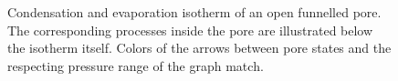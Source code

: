 \documentclass[../../thesis.tex]{subfiles}
\begin{document}
\begin{figure}[p]
{
    \label{fig:open-funnelled-pore-evaporation}}
    \caption{Condensation \protect{} and evaporation \protect{} isotherm of an open funnelled pore. The corresponding processes inside the pore are illustrated below the isotherm itself. Colors of the arrows between pore states and the respecting pressure range of the graph match.}
    \label{fig:open-funnelled-cyl-pore-isos}
\end{figure}
\end{document}
